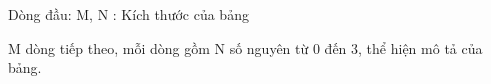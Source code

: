Dòng đầu: M, N : Kích thước của bảng

M dòng tiếp theo, mỗi dòng gồm N số nguyên từ 0 đến 3, thể hiện mô tả của bảng.

\